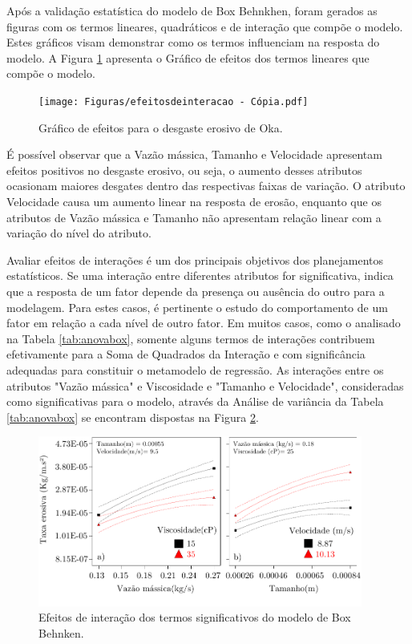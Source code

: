 Após a validação estatística do modelo de Box Behnkhen, foram gerados as figuras com os termos lineares, quadráticos e de interação que compõe o modelo. Estes gráficos visam demonstrar como os termos influenciam na resposta do modelo. A Figura \ref{fig:efeitosbox1} 
apresenta o Gráfico de efeitos dos termos lineares que compõe o modelo. 


\begin{figure}[H] 
    \centering  
    \texttt{[image: Figuras/efeitosdeinteracao - Cópia.pdf]}  
    \caption{Gráfico de efeitos para o desgaste erosivo de Oka.}  
    \label{fig:efeitosbox1}  
\end{figure}

É possível observar que a Vazão mássica, Tamanho e Velocidade apresentam efeitos positivos no desgaste erosivo, ou seja, o aumento desses atributos ocasionam maiores desgates dentro das respectivas faixas de variação. O atributo Velocidade causa um aumento linear na resposta de erosão, enquanto que os atributos de Vazão mássica e Tamanho não apresentam relação linear com a variação do nível do atributo. 

Avaliar efeitos de interações é um dos principais objetivos dos planejamentos estatísticos. Se uma interação entre diferentes atributos for significativa, indica que a resposta de um fator depende da presença ou ausência do outro para a modelagem. Para estes casos, é pertinente o estudo do comportamento de um fator em relação a cada nível de outro fator. Em muitos casos, como o analisado na Tabela \ref{tab:anovabox}, somente alguns termos de interações contribuem efetivamente para a Soma de Quadrados da Interação e com significância adequadas para constituir o metamodelo de regressão.  As interações entre os atributos "Vazão mássica" e Viscosidade e "Tamanho e Velocidade", consideradas como significativas para o modelo, através da Análise de variância da Tabela \ref{tab:anovabox} se encontram dispostas na Figura \ref{fig:efeitosdeint}.

\begin{figure}[H] 
    \centering  
    \includegraphics[width=0.95\textwidth]{Figuras/efeitosdeinteracao.pdf}  
    \caption{Efeitos de interação dos termos significativos do modelo de Box Behnken.}  
    \label{fig:efeitosdeint}  
\end{figure}



